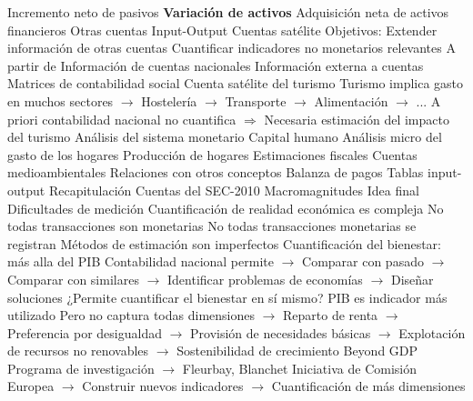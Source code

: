 \documentclass{nuevotema}
\begin{document}
\begin{esquemal}
				\4[] Incremento neto de pasivos
				\4 \textbf{Variación de activos}
				\4[] Adquisición neta de activos financieros
		\2 Otras cuentas
			\3 Input-Output
			\3 Cuentas satélite
				\4 Objetivos:
				\4[] Extender información de otras cuentas
				\4[] Cuantificar indicadores no monetarios relevantes
				\4 A partir de
				\4[] Información de cuentas nacionales
				\4[] Información externa a cuentas
				\4 Matrices de contabilidad social
				\4 Cuenta satélite del turismo
				\4[] Turismo implica gasto en muchos sectores
				\4[] $\to$ Hostelería
				\4[] $\to$ Transporte
				\4[] $\to$ Alimentación
				\4[] $\to$ ...
				\4[] A priori contabilidad nacional no cuantifica
				\4[] $\Rightarrow$ Necesaria estimación del impacto del turismo
				\4 Análisis del sistema monetario
				\4 Capital humano
				\4 Análisis micro del gasto de los hogares
				\4 Producción de hogares
				\4 Estimaciones fiscales
				\4 Cuentas medioambientales
		\2 Relaciones con otros conceptos
			\3 Balanza de pagos
			\3 Tablas input-output
	\1[] 
		\2 Recapitulación
			\3 Cuentas del SEC-2010
			\3 Macromagnitudes
		\2 Idea final
			\3 Dificultades de medición
				\4 Cuantificación de realidad económica es compleja
				\4[] No todas transacciones son monetarias
				\4[] No todas transacciones monetarias se registran
				\4[] Métodos de estimación son imperfectos
			\3 Cuantificación del bienestar: más alla del PIB
				\4 Contabilidad nacional permite
				\4[] $\to$ Comparar con pasado
				\4[] $\to$ Comparar con similares
				\4[] $\to$ Identificar problemas de economías
				\4[] $\to$ Diseñar soluciones
				\4 ¿Permite cuantificar el bienestar en sí mismo?
				\4[] PIB es indicador más utilizado
				\4[] Pero no captura todas dimensiones
				\4[] $\to$ Reparto de renta
				\4[] $\to$ Preferencia por desigualdad
				\4[] $\to$ Provisión de necesidades básicas
				\4[] $\to$ Explotación de recursos no renovables
				\4[] $\to$ Sostenibilidad de crecimiento
				\4 Beyond GDP
				\4[] Programa de investigación
				\4[] $\to$ Fleurbay, Blanchet
				\4[] Iniciativa de Comisión Europea
				\4[] $\to$ Construir nuevos indicadores
				\4[] $\to$ Cuantificación de más dimensiones
\end{esquemal}
\end{document}
